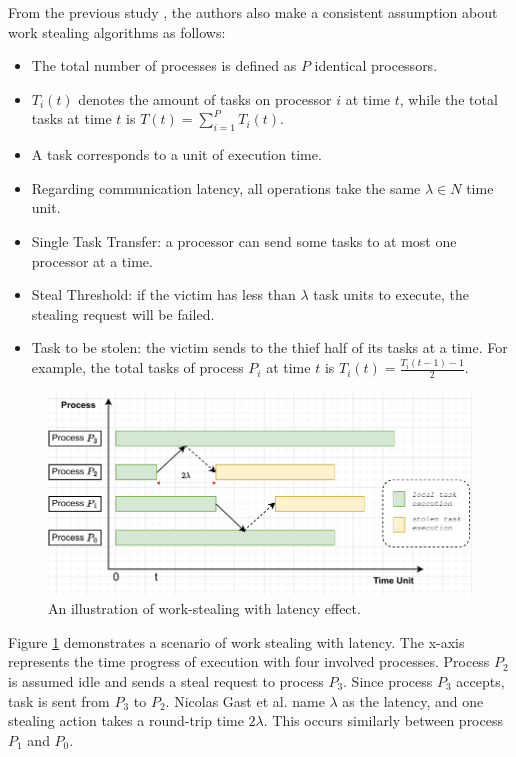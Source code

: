 From the previous study \cite{tchiboukdjian2013decentralized}, the authors also make a consistent assumption about work stealing algorithms as follows:
\begin{itemize}
	\item The total number of processes is defined as $P$ identical processors.
	\item $T_{i}(t)$ denotes the amount of tasks on processor $i$ at time $t$, while the total tasks at time $t$ is $T(t) = \sum_{i=1}^{P}T_{i}(t)$. 
	\item A task corresponds to a unit of execution time.
	\item Regarding communication latency, all operations take the same $\lambda \in N$ time unit.
	\item Single Task Transfer: a processor can send some tasks to at most one processor at a time.
	\item Steal Threshold: if the victim has less than $\lambda$ task units to execute, the stealing request will be failed.
	\item Task to be stolen: the victim sends to the thief half of its tasks at a time. For example, the total tasks of process $P_{i}$ at time $t$ is $T_{i}(t) = \frac{T_{i}(t-1) - 1}{2}$.
\end{itemize}

\begin{figure}[t]
  \centering
  \includegraphics[scale=0.8]{./pictures/perf_analysis_model/perf_analysis_related_model_with_latency.pdf}
	\caption{An illustration of work-stealing with latency effect.}
	\label{fig:perfmodel_relatedmodelwithlatency}
\end{figure}

Figure \ref{fig:perfmodel_relatedmodelwithlatency} demonstrates a scenario of work stealing with latency. The x-axis represents the time progress of execution with four involved processes. Process $P_{2}$ is assumed idle and sends a steal request to process $P_{3}$. Since process $P_{3}$ accepts, task is sent from $P_{3}$ to $P_{2}$. Nicolas Gast et al. \cite{gast2021analysis} name $\lambda$ as the latency, and one stealing action takes a round-trip time $2\lambda$. This occurs similarly between process $P_{1}$ and $P_{0}$.\\

